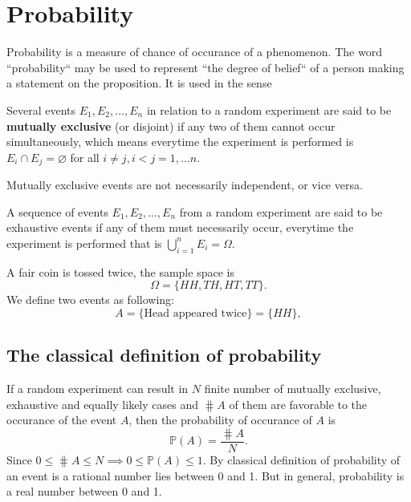 \chapter{Probability}

Probability is a measure of chance of occurance of a phenomenon.
The word ``probability`` may be used to represent ``the degree of belief`` 
of a person making a statement on the proposition. It is used in the sense 

\begin{definition}
    Several events $E_1, E_2, \ldots, E_n$ in relation to a 
    random experiment are said to be \textbf{mutually exclusive} (or disjoint) if any 
    two of them cannot occur simultaneously, which means everytime the 
    experiment is performed is $E_i \cap E_j = \varnothing$ for all $i \neq j, i < j = 1,\ldots n$.
\end{definition}
\begin{remark}
    Mutually exclusive events are not necessarily independent, or vice versa.
\end{remark}

\begin{definition}
    A sequence of events $E_1, E_2, \ldots, E_n$ from a random experiment are said to be 
    exhaustive events if any of them must necessarily occur, everytime the experiment 
    is performed that is $\bigcup^n_{i=1} E_i = \Omega$.
\end{definition}

\begin{example}
    A fair coin is tossed twice, the sample space is 
    \[
        \Omega = \{ HH, TH, HT, TT \}.
    \]
    We define two events as following:
    \[
        A = \{ \text{Head appeared twice}\} = \{ HH \},
    \]
\end{example}

\section{The classical definition of probability}

If a random experiment can result in $N$ finite number of mutually exclusive, exhaustive and 
equally likely cases and $\hash A$ of them are favorable to the occurance of the event $A$, 
then the probability of occurance of $A$ is 
\begin{equation}
    \mathbb{P}(A) = \frac{\hash A }{N}.
\end{equation}
Since $0 \leq \hash A \leq N \implies 0 \leq \mathbb{P}(A) \leq 1$. By classical definition 
of probability of an event is a rational number lies between 0 and 1. But in general,
probability is a real number between 0 and 1.

